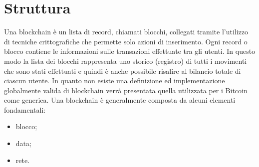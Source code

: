 \section{Struttura}
Una blockchain è un lista di record, chiamati blocchi, collegati tramite l'utilizzo di tecniche crittografiche che permette solo azioni di inserimento. Ogni record o blocco contiene le informazioni sulle transazioni effettuate tra gli utenti.
In questo modo la lista dei blocchi rappresenta uno storico (registro) di tutti i movimenti che sono stati effettuati e quindi è anche possibile risalire al bilancio totale di ciascun utente.
In quanto non esiste una definizione ed implementazione globalmente valida di blockchain verrà presentata quella utilizzata per i Bitcoin come generica.\newline
Una blockchain è generalmente composta da alcuni elementi fondamentali:
\begin{itemize}
    \item blocco;
    \item data;
    \item rete.
\end{itemize}

